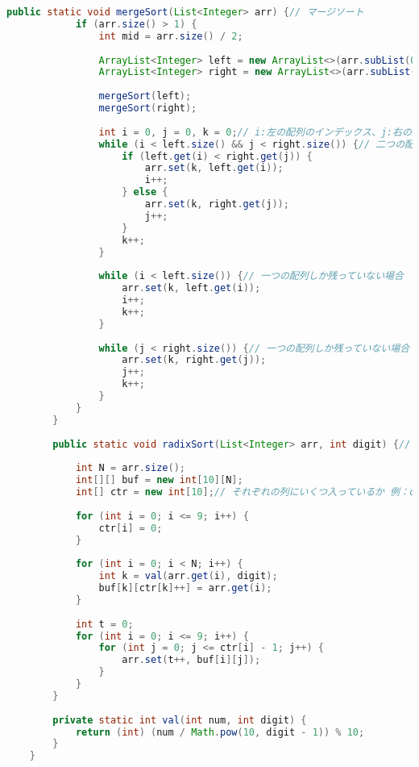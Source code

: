 \documentclass{jsarticle}
\begin{document}
\begin{lstlisting}[label=code:in, language=java]
        public static void mergeSort(List<Integer> arr) {// マージソート
            if (arr.size() > 1) {
                int mid = arr.size() / 2;
    
                ArrayList<Integer> left = new ArrayList<>(arr.subList(0, mid));
                ArrayList<Integer> right = new ArrayList<>(arr.subList(mid, arr.size()));
    
                mergeSort(left);
                mergeSort(right);
    
                int i = 0, j = 0, k = 0;// i:左の配列のインデックス、j:右の配列のインデックス、k:元の配列のインデックス
                while (i < left.size() && j < right.size()) {// 二つの配列を小さいものから順にマージ
                    if (left.get(i) < right.get(j)) {
                        arr.set(k, left.get(i));
                        i++;
                    } else {
                        arr.set(k, right.get(j));
                        j++;
                    }
                    k++;
                }
    
                while (i < left.size()) {// 一つの配列しか残っていない場合
                    arr.set(k, left.get(i));
                    i++;
                    k++;
                }
    
                while (j < right.size()) {// 一つの配列しか残っていない場合
                    arr.set(k, right.get(j));
                    j++;
                    k++;
                }
            }
        }
    
        public static void radixSort(List<Integer> arr, int digit) {// 基数ソート
    
            int N = arr.size();
            int[][] buf = new int[10][N];
            int[] ctr = new int[10];// それぞれの列にいくつ入っているか 例：ctr[0]=3なら0列に3つのデータが入っている
    
            for (int i = 0; i <= 9; i++) {
                ctr[i] = 0;
            }
    
            for (int i = 0; i < N; i++) {
                int k = val(arr.get(i), digit);
                buf[k][ctr[k]++] = arr.get(i);
            }
    
            int t = 0;
            for (int i = 0; i <= 9; i++) {
                for (int j = 0; j <= ctr[i] - 1; j++) {
                    arr.set(t++, buf[i][j]);
                }
            }
        }
    
        private static int val(int num, int digit) {
            return (int) (num / Math.pow(10, digit - 1)) % 10;
        }
    }
\end{lstlisting}
\end{document}
